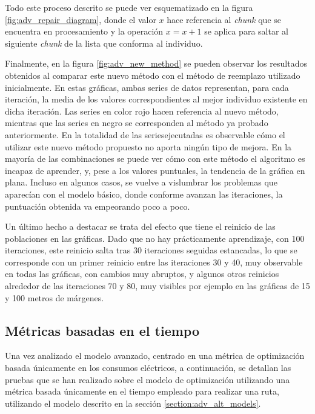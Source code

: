 \documentclass[11pt,spanish,listoffigures,listoftables]{tfgetsinf}
\begin{document}
Todo este proceso descrito se puede ver esquematizado en la figura \ref{fig:adv_repair_diagram}, donde el valor $x$ hace referencia al \textit{chunk} que se encuentra en procesamiento y la operación $x=x+1$ se aplica para saltar al siguiente \textit{chunk} de la lista que conforma al individuo.

Finalmente, en la figura \ref{fig:adv_new_method} se pueden observar los resultados obtenidos al comparar este nuevo método con el método de reemplazo utilizado inicialmente. En estas gráficas, ambas series de datos representan, para cada iteración, la media de los valores correspondientes al mejor individuo existente en dicha iteración. Las series en color rojo hacen referencia al nuevo método, mientras que las series en negro se corresponden al método ya probado anteriormente. En la totalidad de las series\footnotemark  ejecutadas es observable cómo el utilizar este nuevo método propuesto no aporta ningún tipo de mejora. En la mayoría de las combinaciones se puede ver cómo con este método el algoritmo es incapaz de aprender, y, pese a los valores puntuales, la tendencia de la gráfica en plana. Incluso en algunos casos, se vuelve a vislumbrar los problemas que aparecían con el modelo básico, donde conforme avanzan las iteraciones, la puntuación obtenida va empeorando poco a poco.

Un último hecho a destacar se trata del efecto que tiene el reinicio de las poblaciones en las gráficas. Dado que no hay prácticamente aprendizaje, con 100 iteraciones, este reinicio salta tras 30 iteraciones seguidas estancadas, lo que se corresponde con un primer reinicio entre las iteraciones 30 y 40, muy observable en todas las gráficas, con cambios muy abruptos, y algunos otros reinicios alrededor de las iteraciones 70 y 80, muy visibles por ejemplo en las gráficas de 15 y 100 metros de márgenes.


\newpage
\subsection{Métricas basadas en el tiempo}
Una vez analizado el modelo avanzado, centrado en una métrica de optimización basada únicamente en los consumos eléctricos, a continuación, se detallan las pruebas que se han realizado sobre el modelo de optimización utilizando una métrica basada únicamente en el tiempo empleado para realizar una ruta, utilizando el modelo descrito en la sección \ref{section:adv_alt_models}.
\end{document}
